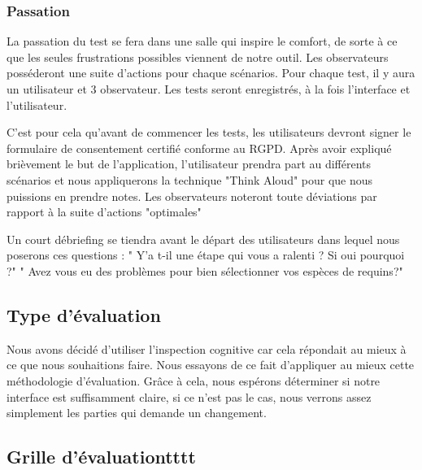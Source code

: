 \documentclass{article}
\begin{document}
\subsubsection{Passation}
La passation du test se fera dans une salle qui inspire le comfort, de sorte à ce que les seules frustrations possibles viennent de notre outil. Les observateurs posséderont une suite d'actions pour chaque scénarios. Pour chaque test, il y aura un utilisateur et 3 observateur. Les tests seront enregistrés, à la fois l'interface et l'utilisateur.

C'est pour cela qu'avant de commencer les tests, les utilisateurs devront signer le formulaire de consentement certifié conforme au RGPD. Après avoir expliqué brièvement le but de l'application, l'utilisateur prendra part au différents scénarios et nous appliquerons la technique "Think Aloud" pour que nous puissions en prendre notes.
Les observateurs noteront toute déviations par rapport à la suite d'actions "optimales"

Un court débriefing se tiendra avant le départ des utilisateurs dans lequel nous poserons ces questions :
" Y'a t-il une étape qui vous a ralenti ? Si oui pourquoi ?"
" Avez vous eu des problèmes pour bien sélectionner vos espèces de requins?"
\subsection{Type d'évaluation}
Nous avons décidé d'utiliser l'inspection cognitive car cela répondait au mieux à ce que nous souhaitions faire. Nous essayons de ce fait d'appliquer au mieux cette méthodologie d'évaluation. Grâce à cela, nous espérons déterminer si notre interface est suffisamment claire, si ce n'est pas le cas, nous verrons assez simplement les parties qui demande un changement.


\subsection{Grille d'évaluationtttt}
\end{document}
